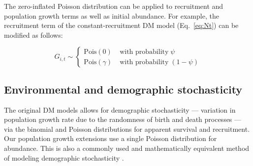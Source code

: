 \documentclass[12pt,english]{article}
\begin{document}
\begin{spacing}{1.9}
\begin{flushleft}


The zero-inflated Poisson distribution can be applied to recruitment and 
population growth terms as well as initial abundance. For example, 
the recruitment term of the constant-recruitment DM model
(Eq.~\ref{eq:Nt}) can be modified as follows:
\begin{linenomath*}
\begin{equation}
G_{i,t} \sim \left\{
\begin{aligned}
\mathrm{Pois}(0) &\; \text{with probability} \; \psi \\
\mathrm{Pois}(\gamma) &\; \text{with probability} \; (1-\psi)\end{aligned} \right.
\label{eq:ZIPts}
\end{equation}
\end{linenomath*}


\subsection*{Environmental and demographic stochasticity}

The original DM models allows for demographic stochasticity --- variation in population growth 
rate due to the randomness of birth and death processes --- %
via the binomial and Poisson distributions for apparent survival and recruitment.  Our population
growth extensions use a single Poisson distribution for abundance. %
This is also a commonly used and mathematically equivalent 
method of modeling demographic stochasticity 
\citep{bonsall_hastings:2004,melbourne_hastings:2008}.  


\end{flushleft}
\end{spacing}
\end{document}
